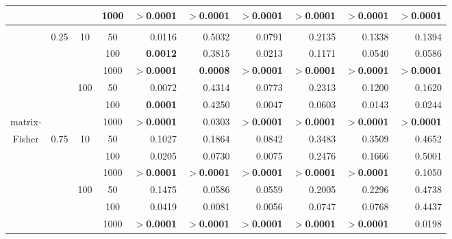 \documentclass[12pt]{article}
\begin{document}
\begin{table}[h!]
\begin{center}
{\begin{tabular}{ccccrrrrrr}
  &  &  & 1000 & $>$\textbf{0.0001} & $>$\textbf{0.0001} & $>$\textbf{0.0001} & $>$\textbf{0.0001} & $>$\textbf{0.0001} & $>$\textbf{0.0001} \\[5pt] \hline\\[-4pt]
  & \multirow{6}{*}{0.25} & \multirow{3}{*}{10} & 50 & 0.0116 & 0.5032 & 0.0791 & 0.2135 & 0.1338 & 0.1394 \\ 
  &  &  & 100 & \textbf{0.0012} & 0.3815 & 0.0213 & 0.1171 & 0.0540 & 0.0586 \\ 
  &  &  & 1000 & $>$\textbf{0.0001} & \textbf{0.0008} & $>$\textbf{0.0001} & $>$\textbf{0.0001} & $>$\textbf{0.0001} & $>$\textbf{0.0001} \\ \cline{3-10}
  &  & \multirow{3}{*}{100} & 50 & 0.0072 & 0.4314 & 0.0773 & 0.2313 & 0.1200 & 0.1620 \\ 
  &  &  & 100 & \textbf{0.0001} & 0.4250 & 0.0047 & 0.0603 & 0.0143 & 0.0244 \\ 
  matrix-&  &  & 1000 & $>$\textbf{0.0001} & 0.0303 & $>$\textbf{0.0001} & $>$\textbf{0.0001} & $>$\textbf{0.0001} & $>$\textbf{0.0001} \\ \cline{2-10}
  Fisher& \multirow{6}{*}{0.75} & \multirow{3}{*}{10} & 50 & 0.1027 & 0.1864 & 0.0842 & 0.3483 & 0.3509 & 0.4652 \\ 
  &  &  & 100 & 0.0205 & 0.0730 & 0.0075 & 0.2476 & 0.1666 & 0.5001 \\ 
  &  &  & 1000 & $>$\textbf{0.0001} & $>$\textbf{0.0001} & $>$\textbf{0.0001} & $>$\textbf{0.0001} & $>$\textbf{0.0001} & 0.1050 \\ \cline{3-10}
  &  & \multirow{3}{*}{100} & 50 & 0.1475 & 0.0586 & 0.0559 & 0.2005 & 0.2296 & 0.4738 \\ 
  &  &  & 100 & 0.0419 & 0.0081 & 0.0056 & 0.0747 & 0.0768 & 0.4437 \\ 
  &  &  & 1000 & $>$\textbf{0.0001} & $>$\textbf{0.0001} & $>$\textbf{0.0001} & $>$\textbf{0.0001} & $>$\textbf{0.0001} & 0.0198 \\ 
   \hline
\end{tabular}}
\end{center}
\end{table}
\end{document}
